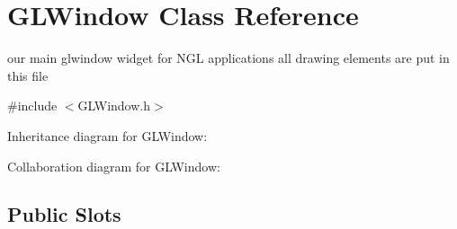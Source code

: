 \hypertarget{classGLWindow}{}\section{G\+L\+Window Class Reference}
\label{classGLWindow}


our main glwindow widget for N\+G\+L applications all drawing elements are put in this file  




{\ttfamily \#include $<$G\+L\+Window.\+h$>$}



Inheritance diagram for G\+L\+Window\+:


Collaboration diagram for G\+L\+Window\+:
\subsection*{Public Slots}
